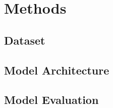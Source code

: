 \documentclass[11pt]{article}
\begin{document}
% 
% 
% 
% 
\section{Methods}

\subsection{Dataset}

\subsection{Model Architecture}


\subsection{Model Evaluation}

\end{document}
